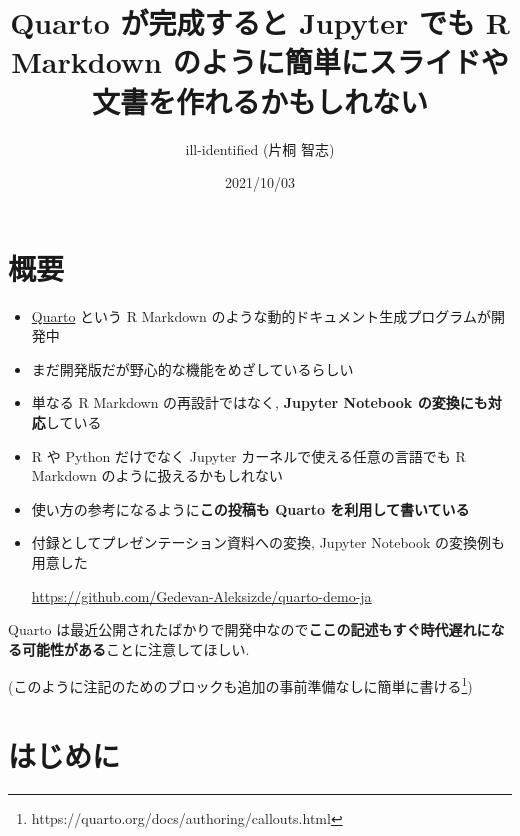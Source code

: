 \documentclass[
  letterpaper,
  DIV=11,
  pandoc,
  ja=standard,
  jafont=noto-otf]{bxjsarticle}
\title{Quarto が完成すると Jupyter でも R Markdown
のように簡単にスライドや文書を作れるかもしれない}
\author{ill-identified (片桐 智志)}
\date{2021/10/03}
\begin{document}
\maketitle

{
\hypersetup{linkcolor=}
\setcounter{tocdepth}{3}
\tableofcontents
}
\hypertarget{ux6982ux8981}{%
\section*{概要}\label{ux6982ux8981}}

\begin{itemize}
\item
  \href{https://quarto.org/}{Quarto} という R Markdown
  のような動的ドキュメント生成プログラムが開発中
\item
  まだ開発版だが野心的な機能をめざしているらしい
\item
  単なる R Markdown の再設計ではなく, \textbf{Jupyter Notebook
  の変換にも対応}している
\item
  R や Python だけでなく Jupyter カーネルで使える任意の言語でも R
  Markdown のように扱えるかもしれない
\item
  使い方の参考になるように\textbf{この投稿も Quarto
  を利用して書いている}
\item
  付録としてプレゼンテーション資料への変換, Jupyter Notebook
  の変換例も用意した

  \url{https://github.com/Gedevan-Aleksizde/quarto-demo-ja}
\end{itemize}

\begin{tcolorbox}[colback=white, toprule=.15mm, title=\textcolor{quarto-callout-caution-color}{\faFire}\hspace{0.5em}注意, toptitle=1mm, arc=.35mm, bottomtitle=1mm, titlerule=0mm, left=2mm, leftrule=.75mm, colbacktitle=quarto-callout-caution-color!10!white, rightrule=.15mm, coltitle=black, bottomrule=.15mm, colframe=quarto-callout-caution-color]
Quarto
は最近公開されたばかりで開発中なので\textbf{ここの記述もすぐ時代遅れになる可能性がある}ことに注意してほしい.

(このように注記のためのブロックも追加の事前準備なしに簡単に書ける\footnote{https://quarto.org/docs/authoring/callouts.html})
\end{tcolorbox}

\hypertarget{ux306fux3058ux3081ux306b}{%
\section{はじめに}\label{ux306fux3058ux3081ux306b}}
\end{document}
